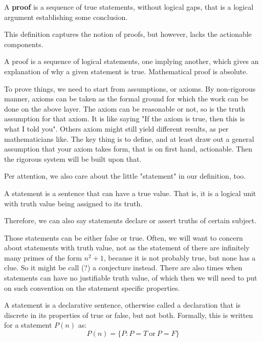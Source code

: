 \begin{definition}[Proof, I]
    A \textbf{proof} is a sequence of true statements, without logical gaps, that is a logical argument establishing some conclusion. 
\end{definition}

This definition captures the notion of proofs, but however, lacks the actionable components. 

\begin{definition}[Proof, II]
    A proof is a sequence of logical statements, one implying another, which gives an explanation of why a given statement is true. Mathematical proof is absolute.
\end{definition}

To prove things, we need to start from assumptions, or axioms. By non-rigorous manner, axioms can be taken as the formal ground for which the work can be done on the above layer. The axiom can be reasonable or not, so is the truth assumption for that axiom. It is like saying "If the axiom is true, then this is what I told you". Others axiom might still yield different results, as per mathematicians like. The key thing is to define, and at least draw out a general assumption that your axiom takes form, that is on first hand, actionable. Then the rigorous system will be built upon that. 

Per attention, we also care about the little "statement" in our definition, too. 
\begin{definition}[Statements, I]
    A statement is a sentence that can have a true value. That is, it is a logical unit with truth value being assigned to its truth. 
\end{definition}

Therefore, we can also say statements declare or assert truths of certain subject. 

Those statements can be either false or true. Often, we will want to concern about statements with truth value, not as the statement of there are infinitely many primes of the form $n^{2}+1$, because it is not probably true, but none has a clue. So it might be call (?) a conjecture instead. There are also times when statements can have no justifiable truth value, of which then we will need to put on such convention on the statement specific properties. 

\begin{definition}[Statements, II]
    A statement is a declarative sentence, otherwise called a declaration that is discrete in its properties of true or false, but not both. Formally, this is written for a statement $P(n)$ as: 
    \begin{equation}
        P(n)=\{P: P=T \: \text{or}\: P = F\}
    \end{equation}
\end{definition}

